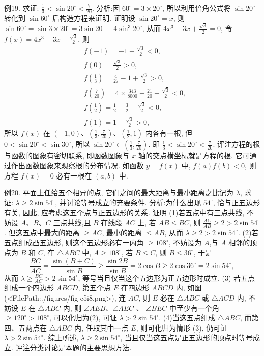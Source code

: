 例19. 求证: $\frac{1}{3}<\sin 20^{\circ}<\frac{7}{20}$.
分析:因 $60^{\circ}=3 \times 20^{\circ}$, 所以利用倍角公式将 $\sin 20^{\circ}$ 转化到 $\sin 60^{\circ}$ 后构造方程来证明.
证明设 $\sin 20^{\circ}=x$, 则 $\sin 60^{\circ}=\sin 3 \times 20^{\circ}=3 \sin 20^{\circ}-4 \sin ^3 20^{\circ}$, 从而 $4 x^3-3 x+\frac{\sqrt{3}}{2}=0$, 令 $f(x)=4 x^3-3 x+\frac{\sqrt{3}}{2}$, 则
$$
\begin{aligned}
& f(-1)=-1+\frac{\sqrt{3}}{2}<0, \\
& f(0)=\frac{\sqrt{3}}{2}>0, \\
& f\left(\frac{1}{3}\right)=\frac{4}{27}-1+\frac{\sqrt{3}}{2}>0, \\
& f\left(\frac{7}{20}\right)=4 \times \frac{343}{8000}-\frac{21}{20}+\frac{\sqrt{3}}{2}<0, \\
& f\left(\frac{1}{2}\right)=\frac{1}{2}-\frac{3}{2}+\frac{\sqrt{3}}{2}<0, \\
& f(1)=1+\frac{\sqrt{3}}{2}>0,
\end{aligned}
$$
所以 $f(x)$ 在 $(-1,0) 、\left(\frac{1}{3}, \frac{7}{20}\right) 、\left(\frac{1}{2}, 1\right)$ 内各有一根, 但 $0<\sin 20^{\circ}< \sin 30^{\circ}$, 所以 $\sin 20^{\circ} \in\left(\frac{1}{3}, \frac{7}{20}\right)$.
即 $\frac{1}{3}<\sin 20^{\circ}<\frac{7}{20}$.
评注方程的根与函数的图象有密切联系, 即函数图象与 $x$ 轴的交点横坐标就是方程的根.
它可通过作出函数图象来观察根的分布情况.
如函数 $y= f(x)$ 中, $f(a) f(b)<0$, 则方程 $f(x)=0$ 必有一根在 $(a, b)$ 中.



例20. 平面上任给五个相异的点, 它们之间的最大距离与最小距离之比记为 $\lambda$, 求证: $\lambda \geqslant 2 \sin 54^{\circ}$, 并讨论等号成立的充要条件.
分析:为什么出现 $54^{\circ}$, 恰与正五边形有关, 因此, 应考虑这五个点与正五边形的关系.
证明  (1)若五点中有三点共线, 不妨设 $A 、 B 、 C$ 三点共线,且 $B$ 在线段 $A C$ 上, 若 $A B \leqslant B C$, 则 $\frac{A C}{A B} \geqslant 2>2 \sin 54^{\circ}$. 但这五点中最大的距离 $\geqslant A C$, 最小的距离 $\leqslant A B$, 从而 $\lambda \geqslant 2>2 \sin 54^{\circ}$.
 (2)若五点组成凸五边形, 则这个五边形必有一内角 $\geqslant 108^{\circ}$, 不妨设为 $A$,与 $A$ 相邻的顶点为 $B$ 和 $C$, 在 $\triangle A B C$ 中, $A \geqslant 108^{\circ}$, 若 $B \leqslant C$, 则 $B \leqslant 36^{\circ}$, 于是
$$
\frac{B C}{A C}=\frac{\sin (B+C)}{\sin B} \geqslant \frac{\sin 2 B}{\sin B}=2 \cos B \geqslant 2 \cos 36^{\circ}=2 \sin 54^{\circ},
$$
从而 $\lambda \geqslant \frac{B C}{A C}>2 \sin 54^{\circ}$, 等号当且仅当这个五边形为正五边形时成立.
(3) 若五点组成一个四边形 $A B C D$, 第五个点 $E$ 在四边形 $A B C D$ 内, 如图(<FilePath:./figures/fig-c5i8.png>), 连 $A C$, 则 $E$ 必在 $\triangle A B C$ 或 $\triangle A C D$ 内, 不妨设 $E$ 在 $\triangle A B C$ 内, 则 $\angle A E B 、 \angle A E C$ 、 $\angle B E C$ 中至少有一个角 $\geqslant 120^{\circ}>108^{\circ}$, 可以化归为(2), 可证 $\lambda>2 \sin 54^{\circ}$.
 (4)当这五点组成 $\triangle A B C$, 而第四、五两点在 $\triangle A B C$ 内, 任取其中一点 $E$, 则可化归为情形 (3), 仍可证 $\lambda>2 \sin 54^{\circ}$.
综上所述, $\lambda \geqslant 2 \sin 54^{\circ}$, 当且仅当这五点是正五边形的顶点时等号成立.
评注分类讨论是本题的主要思想方法.


